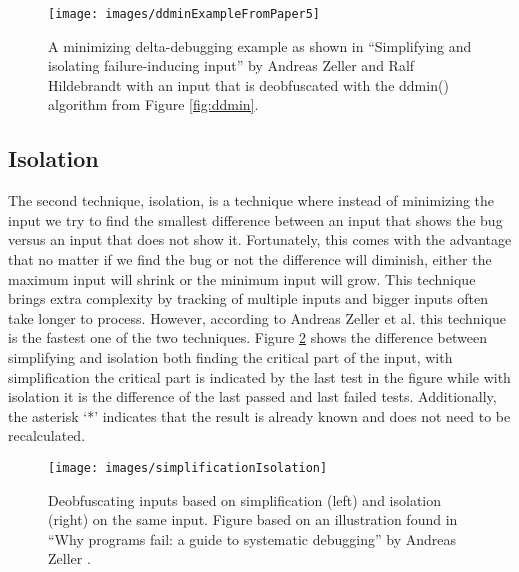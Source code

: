 \begin{figure}
	\centering
	\texttt{[image: images/ddminExampleFromPaper5]}
	\caption{A minimizing delta-debugging example as shown in “Simplifying and isolating failure-inducing input” by Andreas Zeller and Ralf Hildebrandt \cite{5zeller2002simplifyingIsolatingFailure-inducing} with an input that is deobfuscated with the ddmin() algorithm from Figure \ref{fig:ddmin}.}
	\label{fig:ddminExample}
\end{figure}

\subsection{Isolation}
\label{inputReduction:Isolation}
The second technique, isolation, is a technique where instead of minimizing the input we try to find the smallest difference between an input that shows the bug versus an input that does not show it. Fortunately, this comes with the advantage that no matter if we find the bug or not the difference will diminish, either the maximum input will shrink or the minimum input will grow. 
This technique brings extra complexity by tracking of multiple inputs and bigger inputs often take longer to process. However, according to Andreas Zeller et al. \cite{5zeller2002simplifyingIsolatingFailure-inducing} this technique is the fastest one of the two techniques. 
Figure \ref{fig:simplificationIsolation} shows the difference between simplifying and isolation both finding the critical part of the input, with simplification the critical part is indicated by the last test in the figure while with isolation it is the difference of the last passed and last failed tests. Additionally, the  asterisk ‘*’ indicates that the result is already known and does not need to be recalculated.
\begin{figure}
	\centering
	\texttt{[image: images/simplificationIsolation]}
	\caption{Deobfuscating inputs based on simplification (left) and isolation (right) on the same input. Figure based on an illustration found in “Why programs fail: a guide to systematic debugging” by Andreas Zeller \cite{bookZellerwhyProgramsFail}.}
	\label{fig:simplificationIsolation}
\end{figure}

